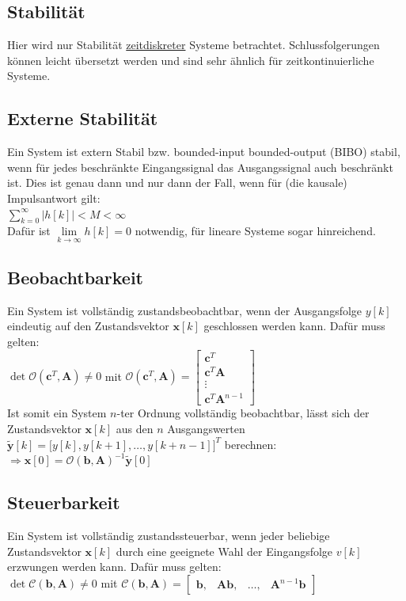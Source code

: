 \documentclass[a4paper,landscape,6pt]{article}
\newcommand{\ma}[1]{\ensuremath{\boldsymbol {#1}}}								%
\newcommand{\mat}[1]{\ensuremath{\begin{bmatrix} #1 \end{bmatrix}}}				%
\renewcommand{\vec}[1]{\ensuremath{\boldsymbol {#1}}}							%
\newcommand{\ul}[1]{\underline{#1}}
\begin{document}
\begin{multicols}{3}
\section{Stabilität}
Hier wird nur Stabilität \ul{zeitdiskreter} Systeme betrachtet. Schlussfolgerungen können leicht übersetzt werden und sind sehr ähnlich für zeitkontinuierliche Systeme.
\subsection*{Externe Stabilität}
Ein System ist extern Stabil bzw. bounded-input bounded-output (BIBO) stabil, wenn für jedes beschränkte Eingangssignal das Ausgangssignal auch beschränkt ist. Dies ist genau dann und nur dann der Fall, wenn für (die kausale) Impulsantwort gilt:\\
\tab \tab $\sum\limits_{k=0}^{\infty}|h[k]| < M < \infty$\\
Dafür ist $\boxed{\lim\limits_{k \rightarrow \infty} h[k] = 0}$ notwendig, für lineare Systeme sogar hinreichend.
\subsection*{Beobachtbarkeit}
Ein System ist vollständig zustandsbeobachtbar, wenn der Ausgangsfolge $y[k]$ eindeutig auf den Zustandsvektor $\vec x[k]$ geschlossen werden kann. Dafür muss gelten:\\
$\boxed{\det \ma{\mathcal{O}}(\vec c^T, \ma A) \neq 0}$ mit $\ma{\mathcal{O}}(\vec c^T, \ma A) = \mat{\vec c^T \\ \vec c^T \ma A \\ \vdots \\ \vec c ^T \ma A^{n-1} }$\\
Ist somit ein System $n$-ter Ordnung vollständig beobachtbar, lässt sich der Zustandsvektor $\vec x[k]$ aus den $n$ Ausgangswerten $ \vec{\tilde y}[k] = \big[y[k], y[k+1], \dots , y[k+n-1]\big]^T$ berechnen:
$\Rightarrow \vec x[0] = \ma{\mathcal{O}}(\vec b, \ma A)^{-1} \vec{\tilde y}[0]$
\subsection*{Steuerbarkeit}
Ein System ist vollständig zustandssteuerbar, wenn jeder beliebige Zustandsvektor $\vec x[k]$ durch eine geeignete Wahl der Eingangsfolge $v[k]$ erzwungen werden kann. Dafür muss gelten:\\

$\boxed{\det \ma{\mathcal{C}}(\vec b, \ma A) \neq 0}$ mit $\ma{\mathcal{C}}(\vec b, \ma A) = \mat{\vec b ,& \ma A \vec b ,& \dots ,&  \ma A^{n-1} \vec b}$\\


\end{multicols}
\end{document}
